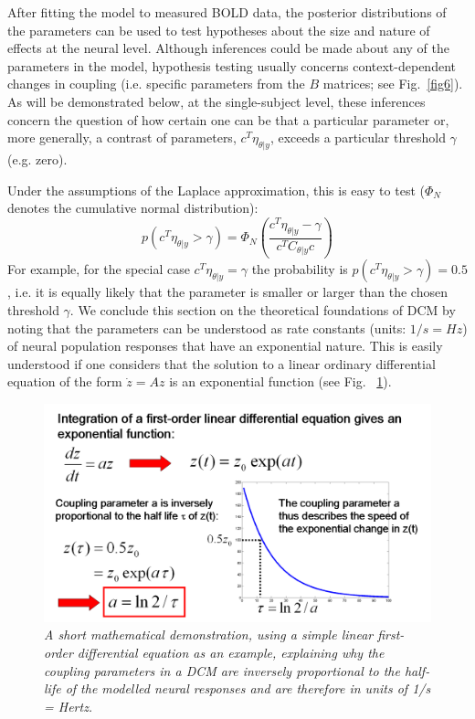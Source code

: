 After fitting the model to measured BOLD data, the posterior distributions of the parameters can be used to test hypotheses about the size and nature of effects at the neural level.  Although inferences could be made about any of the parameters in the model, hypothesis testing usually concerns context-dependent changes in coupling (i.e. specific parameters from the $B$ matrices; see Fig.~\ref{fig6}).  As will be demonstrated below, at the single-subject level, these inferences concern the question of how certain one can be that a particular parameter or, more generally, a contrast of parameters, $c^T \eta_{\theta | y}$, exceeds a particular threshold  $\gamma$ (e.g. zero).

Under the assumptions of the Laplace approximation, this is easy to test ($\Phi_N$ denotes the cumulative normal distribution):
\begin{equation}
p(c^T \eta_{\theta | y} > \gamma) = \Phi_N \left(\frac{c^T \eta_{\theta | y} - \gamma}{c^T C_{\theta | y} c} \right)
\end{equation}
For example, for the special case $c^T \eta_{\theta | y} = \gamma$ the probability is $p(c^T \eta_{\theta | y} > \gamma)=0.5$, i.e. it is equally likely that the parameter is smaller or larger than the chosen threshold $\gamma$.
We conclude this section on the theoretical foundations of DCM by noting that the parameters can be understood as rate constants (units: $1/s = Hz$) of neural population responses that have an exponential nature.  This is easily understood if one considers that the solution to a linear ordinary differential equation of the form $\dot{z}=Az$ is an exponential function (see Fig. ~\ref{fig3}).
\begin{figure}[ht]
\begin{center}
\includegraphics[width=120mm]{dcm/Fig3}
\caption{\em A short mathematical demonstration, using a simple linear first-order differential equation as an example, explaining why the coupling parameters in a DCM are inversely proportional to the half-life of the modelled neural responses and are therefore in units of 1/s = Hertz.\label{fig3}}
\end{center}
\end{figure}

